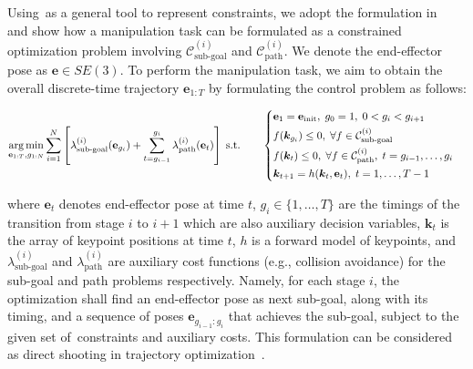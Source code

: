 Using~\algabrvname as a general tool to represent constraints, we adopt the formulation in~\cite{toussaint2022sequence} and show how a manipulation task can be formulated as a constrained optimization problem involving $\mathcal{C}_{\text{sub-goal}}^{(i)}$ and $\mathcal{C}_{\text{path}}^{(i)}$.
We denote the end-effector pose as $\mathbf{e} \in SE(3)$.%
To perform the manipulation task, we aim to obtain the overall discrete-time trajectory $\mathbf{e}_{1:T}$ by formulating the control problem as follows:

\vspace{-2.0em}
\begin{equation}\label{eq:problem}
\begin{split}
\operatorname*{arg\,min}_{\mathbf{e}_{1:T}, g_{1:N}} & \sum_{i=1}^N \left[ \lambda_{\text{sub-goal}}^{(i)}(\mathbf{e}_{g_i}) + \sum_{t=g_{i-1}}^{g_i} \lambda_{\text{path}}^{(i)}(\mathbf{e}_t) \right] \; \text{s.t.}
\end{split}
\quad
\begin{aligned}
& \left\{
\begin{aligned}
& \mathbf{e}_1 = \mathbf{e_{\text{init}}}, \; g_0 = 1, \; 0 < g_i < g_{i+1}\\
& f(\bm{k}_{g_i}) \leq 0, \; \forall f \in \mathcal{C}_{\text{sub-goal}}^{(i)} \\
& f(\bm{k}_t) \leq 0, \; \forall f \in \mathcal{C}_{\text{path}}^{(i)}, \; t = g_{i-1}, \ldots, g_i \\
& \bm{k}_{t+1} = h(\bm{k}_t, \mathbf{e}_t), \; t = 1, \ldots, T-1
\end{aligned}
\right.
\end{aligned}
\end{equation}
\vspace{-2.0em}


where $\mathbf{e}_t$ denotes end-effector pose at time $t$,
$g_i \in \{1, \ldots, T\}$ are the timings of the transition from stage $i$ to $i+1$ which are also auxiliary decision variables,
$\bm{k}_t$ is the array of keypoint positions at time $t$,
$h$ is a forward model of keypoints,
and $\lambda_{\text{sub-goal}}^{(i)}$ and $\lambda_{\text{path}}^{(i)}$ are auxiliary cost functions (e.g., collision avoidance) for the sub-goal and path problems respectively.
Namely, for each stage $i$, the optimization shall find an end-effector pose as next sub-goal, along with its timing, and a sequence of poses $\mathbf{e}_{g_{i-1}:g_{i}}$ that achieves the sub-goal, subject to the given set of~\algabrvname constraints and auxiliary costs.
This formulation can be considered as direct shooting in trajectory optimization~\cite{underactuated}.

